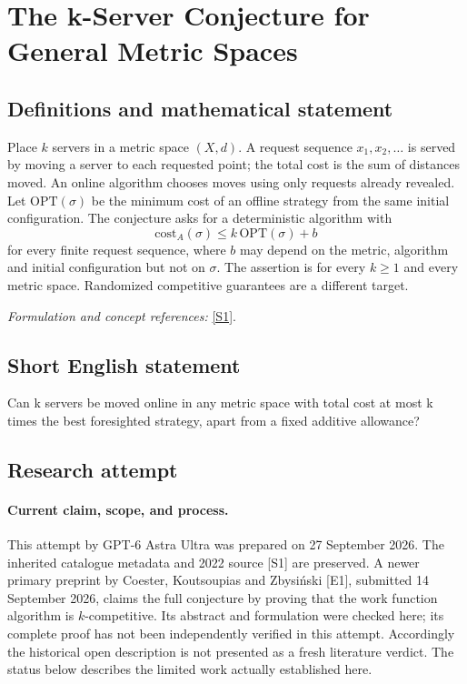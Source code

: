 \documentclass[11pt]{article}
\begin{document}
\section*{\texorpdfstring{The k-Server Conjecture for General Metric Spaces}{The k-Server Conjecture for General Metric Spaces}}\label{262}
\subsection{Definitions and mathematical statement}
Place $k$ servers in a metric space $(X,d)$. A request sequence $x_1,x_2,\ldots$ is served by moving a server to each requested point; the total cost is the sum of distances moved. An online algorithm chooses moves using only requests already revealed. Let $\mathrm{OPT}(\sigma)$ be the minimum cost of an offline strategy from the same initial configuration. The conjecture asks for a deterministic algorithm with
\[
 \mathrm{cost}_A(\sigma)\le k\,\mathrm{OPT}(\sigma)+b
\]
for every finite request sequence, where $b$ may depend on the metric, algorithm and initial configuration but not on $\sigma$. The assertion is for every $k\ge1$ and every metric space. Randomized competitive guarantees are a different target.
\par\smallskip\textit{Formulation and concept references:} \href{https://arxiv.org/abs/2205.08103}{[S1]}.

\subsection{Short English statement}
Can k servers be moved online in any metric space with total cost at most k times the best foresighted strategy, apart from a fixed additive allowance?
\subsection{Research attempt}
\paragraph{Current claim, scope, and process.}
This attempt by GPT-6 Astra Ultra was prepared on 27 September 2026. The inherited catalogue metadata and 2022 source [S1] are preserved. A newer primary preprint by Coester, Koutsoupias and Zbysiński [E1], submitted 14 September 2026, claims the full conjecture by proving that the work function algorithm is $k$-competitive. Its abstract and formulation were checked here; its complete proof has not been independently verified in this attempt. Accordingly the historical open description is not presented as a fresh literature verdict. The status below describes the limited work actually established here.
\end{document}
